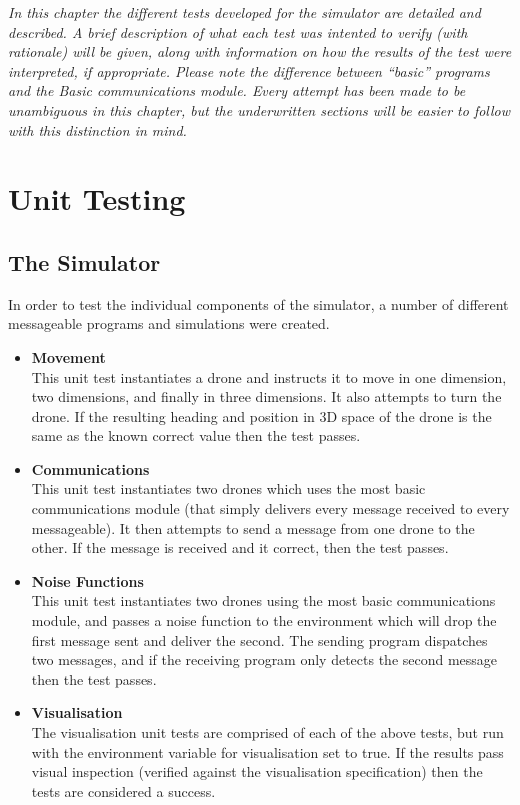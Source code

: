\emph{In this chapter the different tests developed for the simulator are detailed and described. A brief description of what each test was intented to verify (with rationale) will be given, along with information on how the results of the test were interpreted, if appropriate. Please note the difference between ``basic'' programs and the Basic communications module. Every attempt has been made to be unambiguous in this chapter, but the underwritten sections will be easier to follow with this distinction in mind.}

\section{Unit Testing}

\subsection{The Simulator}
In order to test the individual components of the simulator, a number of different messageable programs and simulations were created.

\begin{itemize}
\item \textbf{Movement} \\
This unit test instantiates a drone and instructs it to move in one dimension, two dimensions, and finally in three dimensions. It also attempts to turn the drone. If the resulting heading and position in 3D space of the drone is the same as the known correct value then the test passes.

\item \textbf{Communications} \\
This unit test instantiates two drones which uses the most basic communications module (that simply delivers every message received to every messageable). It then attempts to send a message from one drone to the other. If the message is received and it correct, then the test passes.

\item \textbf{Noise Functions} \\
This unit test instantiates two drones using the most basic communications module, and passes a noise function to the environment which will drop the first message sent and deliver the second. The sending program dispatches two messages, and if the receiving program only detects the second message then the test passes.

\item \textbf{Visualisation} \\
The visualisation unit tests are comprised of each of the above tests, but run with the environment variable for visualisation set to true. If the results pass visual inspection (verified against the visualisation specification) then the tests are considered a success.
\end{itemize}

